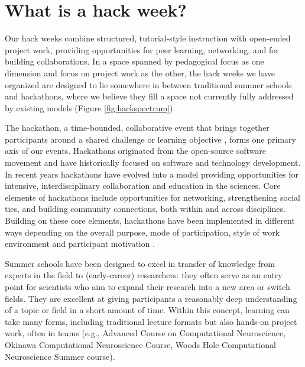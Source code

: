 \section*{What is a hack week?}

Our hack weeks combine structured, tutorial-style instruction with open-ended project work, providing opportunities for peer learning, networking, and for building collaborations.
In a space spanned by pedagogical focus as one dimension and focus on project work as the other, the hack weeks we have organized are designed to lie somewhere in between traditional summer schools and hackathons, where we believe they fill a space not currently fully addressed by existing models (Figure \ref{fig:hackspectrum}).

The hackathon, a time-bounded, collaborative event that brings together participants around a shared challenge or learning objective \cite{Decker2015}, forms one primary axis of our events.
Hackathons originated from the open-source software movement and have historically focused on software and technology development.
In recent years hackathons have evolved into a model providing opportunities for intensive, interdisciplinary collaboration \cite{Groen2015-cj} and education \cite{Kienzler2015-zu,Lamers2014-xf} in the sciences.
Core elements of hackathons include opportunities for networking, strengthening social ties, and building community connections, both within and across disciplines.
Building on these core elements, hackathons have been implemented in different ways depending on the overall purpose, mode of participation, style of work environment and participant motivation \cite{Drouhard2017}.

Summer schools have been designed to excel in transfer of knowledge from experts in the field to (early-career) researchers: they often serve as an entry point for scientists who aim to expand their research into a new area or switch fields. They are excellent at giving participants a reasonably deep understanding of a topic or field in a short amount of time. Within this concept, learning can take many forms, including traditional lecture formats but also hands-on project work, often in teams (e.g., Advanced Course on Computational Neuroscience, Okinawa Computational Neuroscience Course, Woods Hole Computational Neuroscience Summer course).

